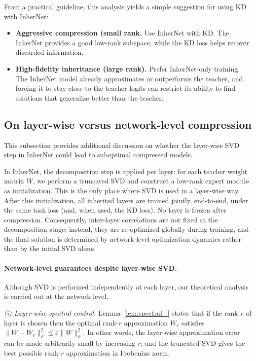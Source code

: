 \documentclass{article} %
\begin{document}
From a practical guideline, this analysis yields a simple suggestion for using KD with InherNet:
\begin{itemize}[leftmargin=*, topsep=2pt, itemsep=2pt]
\item \textbf{Aggressive compression (small rank.}
Use InherNet with KD. The InherNet provides a good low-rank subspace, while the KD loss helps recover discarded information.
\item \textbf{High-fidelity inheritance (large rank).}
Prefer InherNet-only training. The InherNet model already approximates or outperforms the teacher, and forcing it to stay close to the teacher logits can restrict its ability to find solutions that generalize better than the teacher.
\end{itemize}

\subsection{On layer-wise versus network-level compression}
\label{app:layerwise-compression}

This subsection provides additional discussion on whether the layer-wise SVD step in InherNet could lead to suboptimal compressed models.


In InherNet, the decomposition step is applied per layer: for each teacher weight matrix $W$, we perform a truncated SVD and construct a low-rank expert module as initialization. This is the only place where SVD is used in a layer-wise way. After this initialization, all inherited layers are trained jointly, end-to-end, under the same task loss (and, when used, the KD loss). No layer is frozen after compression. Consequently, inter-layer correlations are not fixed at the decomposition stage; instead, they are re-optimized globally during training, and the final solution is determined by network-level optimization dynamics rather than by the initial SVD alone.

\paragraph{Network-level guarantees despite layer-wise SVD.}
Although SVD is performed independently at each layer, our theoretical analysis is carried out at the network level.

\emph{(i) Layer-wise spectral control.}
Lemma~\ref{lem:spectral_} states that if the rank $r$ of layer is chosen then the optimal rank-$r$ approximation $W_{r}$ satisfies $\|W - W_{r}\|_F^2  \leq  \varepsilon \|W\|_F^2$. In other words, the layer-wise approximation error can be made arbitrarily small by increasing $r$, and the truncated SVD gives the best possible rank-$r$ approximation in Frobenius norm.
\end{document}
